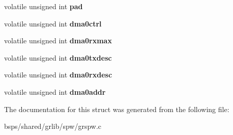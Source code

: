 \begin{DoxyCompactItemize}
volatile unsigned int {\bfseries pad}
\item 
\mbox{\label{structLEON3__SPACEWIRE__Regs__Map_aed7076f1093e43d5fc97de8442447cbc}} 
volatile unsigned int {\bfseries dma0ctrl}
\item 
\mbox{\label{structLEON3__SPACEWIRE__Regs__Map_a770d0160d58d2859517049dbbe6d262f}} 
volatile unsigned int {\bfseries dma0rxmax}
\item 
\mbox{\label{structLEON3__SPACEWIRE__Regs__Map_ab74cc258fa887e8898144442137b7743}} 
volatile unsigned int {\bfseries dma0txdesc}
\item 
\mbox{\label{structLEON3__SPACEWIRE__Regs__Map_a8b5e2dc6c7d1886e155acc87fdfaa8a6}} 
volatile unsigned int {\bfseries dma0rxdesc}
\item 
\mbox{\label{structLEON3__SPACEWIRE__Regs__Map_a2e77da667c6fbb7a4b76eb5ff87a746d}} 
volatile unsigned int {\bfseries dma0addr}
\end{DoxyCompactItemize}


The documentation for this struct was generated from the following file\+:\begin{DoxyCompactItemize}
\item 
bsps/shared/grlib/spw/grspw.\+c\end{DoxyCompactItemize}
